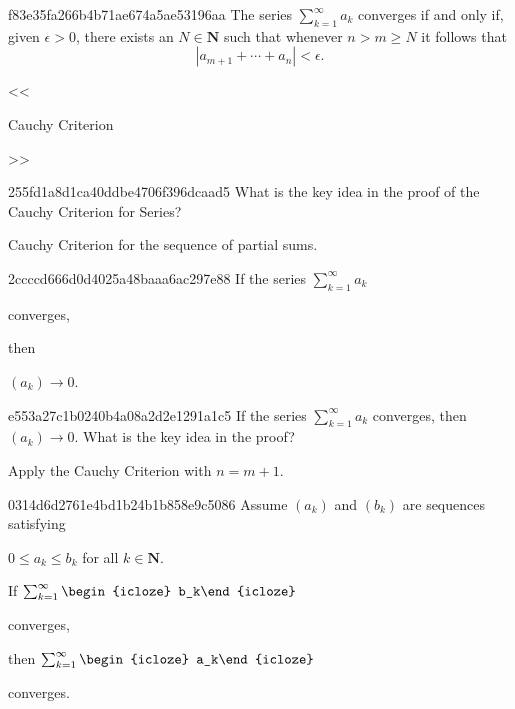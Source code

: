 \begin{note}{f83e35fa266b4b71ae674a5ae53196aa}
    The series \({ \sum_{k=1}^{\infty} a_k }\) converges if and only if, given \({ \epsilon > 0 }\), there exists an \({ N \in \mathbf{N} }\) such that whenever \({ n > m \geq N }\) it follows that
    \[
        \left\lvert a_{m + 1} + \cdots + a_n \right\rvert < \epsilon.
    \]

    \begin{center}
        \tiny
        <<\begin{icloze}{1}Cauchy Criterion\end{icloze}>>
    \end{center}
\end{note}

\begin{note}{255fd1a8d1ca40ddbe4706f396dcaad5}
    What is the key idea in the proof of the Cauchy Criterion for Series?

    \begin{cloze}{1}
        Cauchy Criterion for the sequence of partial sums.
    \end{cloze}
\end{note}

\begin{note}{2ccccd666d0d4025a48baaa6ac297e88}
    If the series \({ \sum_{k=1}^{\infty} a_k }\) \begin{icloze}{2}converges,\end{icloze} then \begin{icloze}{1}\({ (a_k) \to 0 }\).\end{icloze}
\end{note}

\begin{note}{e553a27c1b0240b4a08a2d2e1291a1c5}
    If the series \({ \sum_{k=1}^{\infty} a_k }\) converges, then \({ (a_k) \to 0 }\).
    What is the key idea in the proof?

    \begin{cloze}{1}
        Apply the Cauchy Criterion with \({ n = m + 1 }\).
    \end{cloze}
\end{note}

\begin{note}{0314d6d2761e4bd1b24b1b858e9c5086}
    Assume \({ (a_k) }\) and \({ (b_k) }\) are sequences satisfying \begin{icloze}{3}\({ 0 \leq a_k \leq b_k }\) for all \({ k \in \mathbf{N} }\).\end{icloze}
    If \({ \sum_{k=1}^{\infty} \begin{icloze}{1}b_k\end{icloze} }\) \begin{icloze}{2}converges,\end{icloze} then \({ \sum_{k=1}^{\infty} \begin{icloze}{1}a_k\end{icloze} }\) \begin{icloze}{2}converges.\end{icloze}
\end{note}

